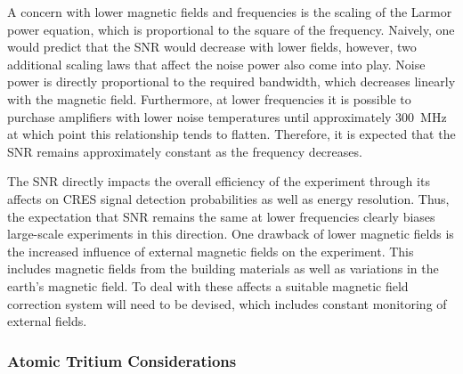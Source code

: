 A concern with lower magnetic fields and frequencies is the scaling of the Larmor power equation, which is proportional to the square of the frequency. Naively, one would predict that the SNR would decrease with lower fields, however, two additional scaling laws that affect the noise power also come into play. Noise power is directly proportional to the required bandwidth, which decreases linearly with the magnetic field. Furthermore, at lower frequencies it is possible to purchase amplifiers with lower noise temperatures until approximately 300~MHz at which point this relationship tends to flatten. Therefore, it is expected that the SNR remains approximately constant as the frequency decreases.

The SNR directly impacts the overall efficiency of the experiment through its affects on CRES signal detection probabilities as well as energy resolution. Thus, the expectation that SNR remains the same at lower frequencies clearly biases large-scale experiments in this direction. One drawback of lower magnetic fields is the increased influence of external magnetic fields on the experiment. This includes magnetic fields from the building materials as well as variations in the earth's magnetic field. To deal with these affects a suitable magnetic field correction system will need to be devised, which includes constant monitoring of external fields.

\subsubsection*{Atomic Tritium Considerations}

